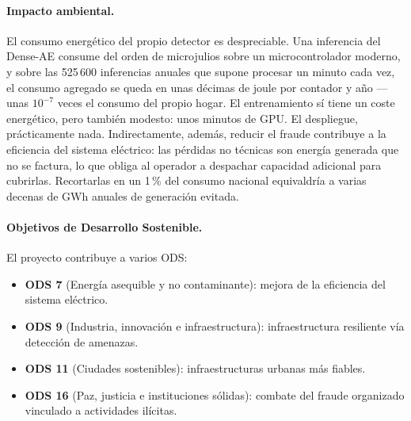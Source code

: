 \paragraph{Impacto ambiental.} El consumo energético del propio detector es despreciable. Una inferencia del Dense-AE consume del orden de microjulios sobre un microcontrolador moderno, y sobre las 525\,600 inferencias anuales que supone procesar un minuto cada vez, el consumo agregado se queda en unas décimas de joule por contador y año ---unas $10^{-7}$ veces el consumo del propio hogar. El entrenamiento sí tiene un coste energético, pero también modesto: unos minutos de GPU. El despliegue, prácticamente nada. Indirectamente, además, reducir el fraude contribuye a la eficiencia del sistema eléctrico: las pérdidas no técnicas son energía generada que no se factura, lo que obliga al operador a despachar capacidad adicional para cubrirlas. Recortarlas en un 1\,\% del consumo nacional equivaldría a varias decenas de GWh anuales de generación evitada.

\paragraph{Objetivos de Desarrollo Sostenible.} El proyecto contribuye a varios ODS:
\begin{itemize}[leftmargin=*,topsep=0pt]
  \item \textbf{ODS 7} (Energía asequible y no contaminante): mejora de la eficiencia del sistema eléctrico.
  \item \textbf{ODS 9} (Industria, innovación e infraestructura): infraestructura resiliente vía detección de amenazas.
  \item \textbf{ODS 11} (Ciudades sostenibles): infraestructuras urbanas más fiables.
  \item \textbf{ODS 16} (Paz, justicia e instituciones sólidas): combate del fraude organizado vinculado a actividades ilícitas.
\end{itemize}
